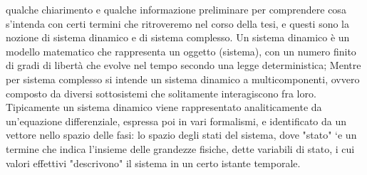 qualche chiarimento e qualche informazione 
preliminare per comprendere cosa s'intenda con certi termini che ritroveremo
nel corso della tesi, e questi sono la nozione di sistema dinamico e di sistema complesso.
Un sistema dinamico è un modello matematico che rappresenta un oggetto (sistema),
con un numero finito di gradi di libertà che evolve nel tempo secondo una legge
deterministica; Mentre per sistema complesso si intende un sistema dinamico a multicomponenti,
ovvero composto da diversi sottosistemi che solitamente interagiscono fra loro.
Tipicamente un sistema dinamico viene rappresentato analiticamente da un’equazione
differenziale, espressa poi in vari formalismi, e identificato da un vettore nello
spazio delle fasi: lo spazio degli stati del sistema, dove "stato" `e un termine che
indica l’insieme delle grandezze fisiche, dette variabili di stato, i cui valori
effettivi "descrivono" il sistema in un certo istante temporale.

